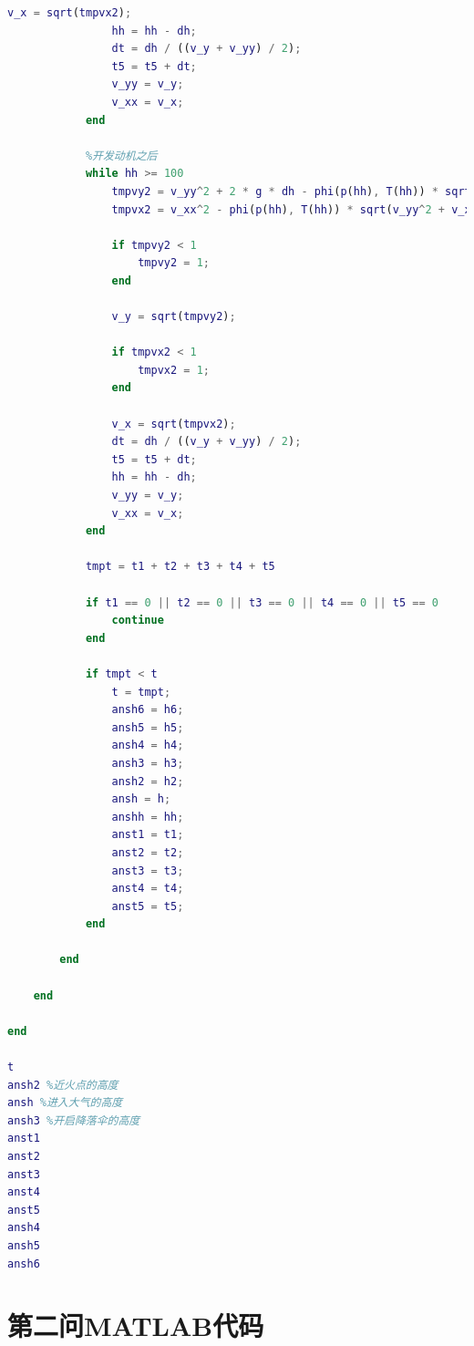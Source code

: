 \documentclass[hyperref,a4paper,UTF8]{ctexart}
\begin{document}
\begin{lstlisting}[language=Matlab]
                v_x = sqrt(tmpvx2);
                hh = hh - dh;
                dt = dh / ((v_y + v_yy) / 2);
                t5 = t5 + dt;
                v_yy = v_y;
                v_xx = v_x;
            end

            %开发动机之后
            while hh >= 100
                tmpvy2 = v_yy^2 + 2 * g * dh - phi(p(hh), T(hh)) * sqrt(v_yy^2 + v_xx^2) * S_floor * dh * v_yy / (m - m_floor - m_para - m_hide) - 2 * 7500 * dh * v_yy / ((m - m_floor - m_para - m_hide) * sqrt(v_yy^2 + v_xx^2));
                tmpvx2 = v_xx^2 - phi(p(hh), T(hh)) * sqrt(v_yy^2 + v_xx^2) * S_floor * dh * v_xx^2 / (v_yy * (m - m_floor - m_para - m_hide)) - 2 * 7500 * dh * v_xx^2 / (v_yy * sqrt(v_yy^2 + v_xx^2) * (m - m_floor - m_para - m_hide));

                if tmpvy2 < 1
                    tmpvy2 = 1;
                end

                v_y = sqrt(tmpvy2);

                if tmpvx2 < 1
                    tmpvx2 = 1;
                end

                v_x = sqrt(tmpvx2);
                dt = dh / ((v_y + v_yy) / 2);
                t5 = t5 + dt;
                hh = hh - dh;
                v_yy = v_y;
                v_xx = v_x;
            end

            tmpt = t1 + t2 + t3 + t4 + t5

            if t1 == 0 || t2 == 0 || t3 == 0 || t4 == 0 || t5 == 0
                continue
            end

            if tmpt < t
                t = tmpt;
                ansh6 = h6;
                ansh5 = h5;
                ansh4 = h4;
                ansh3 = h3;
                ansh2 = h2;
                ansh = h;
                anshh = hh;
                anst1 = t1;
                anst2 = t2;
                anst3 = t3;
                anst4 = t4;
                anst5 = t5;
            end

        end

    end

end

t
ansh2 %近火点的高度
ansh %进入大气的高度
ansh3 %开启降落伞的高度
anst1
anst2
anst3
anst4
anst5
ansh4
ansh5
ansh6

\end{lstlisting}

\section{第二问MATLAB代码}
\end{document}

